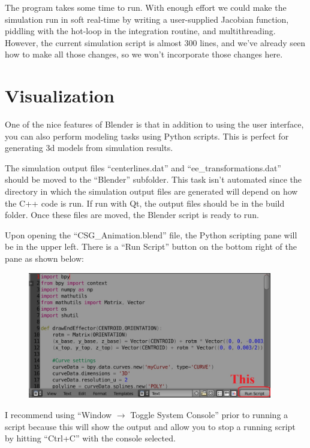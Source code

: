 \documentclass[12pt]{article}
\begin{document}
The program takes some time to run. With enough effort we could make the simulation run in soft real-time by writing a user-supplied Jacobian function, piddling with the hot-loop in the integration routine, and multithreading. However, the current simulation script is almost 300 lines, and we've already seen how to make all those changes, so we won't incorporate those changes here.

\section{Visualization}

One of the nice features of Blender is that in addition to using the user interface, you can also perform modeling tasks using Python scripts. This is perfect for generating 3d models from simulation results.

The simulation output files ``centerlines.dat'' and ``ee\_transformations.dat'' should be moved to the ``Blender'' subfolder. This task isn't automated since the directory in which the simulation output files are generated will depend on how the C++ code is run. If run with Qt, the output files should be in the build folder. Once these files are moved, the Blender script is ready to run.

Upon opening the ``CSG\_Animation.blend'' file, the Python scripting pane will be in the upper left. There is a ``Run Script'' button on the bottom right of the pane as shown below:
\begin{figure}[h]
	\centering
		\includegraphics[width=0.95\textwidth]{fig/ScriptingPane.jpg}
	\label{fig:Pane}
\end{figure}

\noindent I recommend using ``Window $\rightarrow$ Toggle System Console'' prior to running a script because this will show the output and allow you to stop a running script by hitting ``Ctrl+C'' with the console selected.
\end{document}

